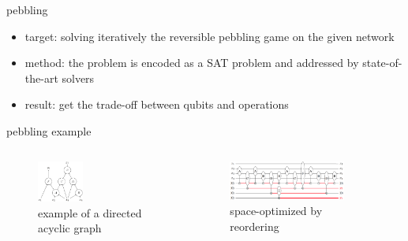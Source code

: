 \begin{frame}{pebbling}
  \begin{itemize}
    \item target: solving iteratively the reversible pebbling game on the given network
    \item method: the problem is encoded as a SAT problem and addressed by state-of-the-art solvers
    \item result: get the trade-off between qubits and operations
  \end{itemize}
\end{frame}
\begin{frame}{pebbling example}
  \begin{columns}
      \begin{minipage}[c][0.4\textheight][c]{\linewidth}
        \begin{figure}[h]
          \centering
          \includegraphics[width=0.4\textwidth]{figure/DAG.png}
          \caption{example of a directed acyclic graph}
        \end{figure}
      \end{minipage}
      \begin{minipage}[c][0.4\textheight][c]{\linewidth}
        \begin{figure}[h]
          \centering
          \includegraphics[width=0.8\textwidth]{figure/c.png}
          \caption{space-optimized by reordering}
        \end{figure}
      \end{minipage}
      

\end{columns}
\end{frame}
